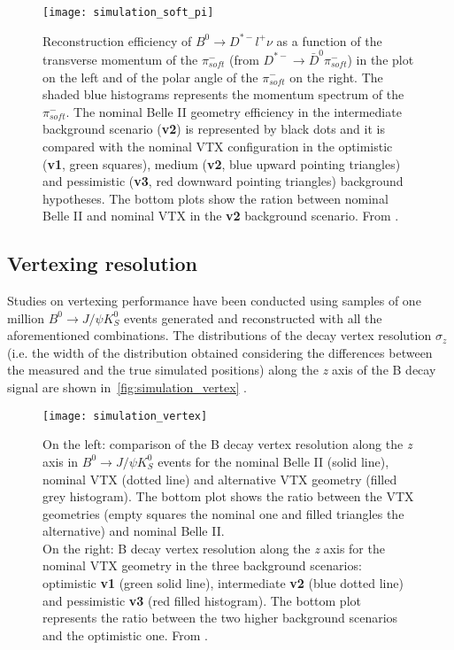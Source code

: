 \begin{figure}[h!]
\centering
\texttt{[image: simulation\_soft\_pi]}
\caption{Reconstruction efficiency of $B^{0} \rightarrow D^{*-}l^{+}\nu$ as a function of the transverse momentum of the $\pi_{soft}^{-}$ (from  $D^{*-} \rightarrow \bar{D}^{0} \pi^{-}_{soft}$) in the plot on the left and of the polar angle of the $\pi_{soft}^{-}$ on the right. 
The shaded blue histograms represents the momentum spectrum of the  $\pi_{soft}^{-}$.
The nominal Belle II geometry efficiency in the intermediate background scenario (\textbf{v2}) is represented by black dots and it is compared with the nominal VTX configuration in the optimistic (\textbf{v1}, green squares), medium (\textbf{v2}, blue upward pointing triangles) and pessimistic (\textbf{v3}, red downward
pointing triangles) background hypotheses. The bottom plots show the ration between nominal Belle II and nominal VTX in the \textbf{v2} background scenario. From \cite{F.Forti:3930}.}
\label{fig:simulation_soft_pi}
\end{figure}


\subsection{Vertexing resolution}

Studies on vertexing performance have been conducted using samples of one million $B^{0} \rightarrow J/\psi K_{S}^{0}$ events generated and reconstructed with all the aforementioned combinations.
The distributions of the decay vertex resolution $\sigma_{z}$ (i.e. the width of the distribution obtained considering the differences between the measured and the true simulated positions) along the \textit{z} axis of the B decay signal are shown in~\autoref{fig:simulation_vertex} .

\begin{figure}[h!]
\centering
\texttt{[image: simulation\_vertex]}
\caption{On the left: comparison of the B decay vertex resolution along the \textit{z} axis in $B^{0} \rightarrow J/\psi K_{S}^{0}$ events for the nominal Belle II (solid line), nominal VTX (dotted line) and alternative VTX geometry (filled grey histogram). The bottom plot shows the ratio between the VTX geometries (empty squares the nominal one and filled triangles the alternative) and nominal Belle II. \\
On the right:  B decay vertex resolution along the \textit{z} axis for the nominal VTX geometry in the three background scenarios: optimistic \textbf{v1} (green solid line), intermediate \textbf{v2} (blue dotted line) and pessimistic \textbf{v3} (red filled histogram). The bottom plot represents the ratio between the two higher background scenarios and the optimistic one. From \cite{F.Forti:3930}.}
\label{fig:simulation_vertex}
\end{figure}

